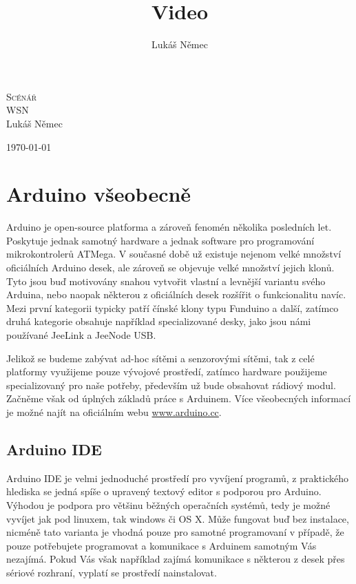 \documentclass[12pt,titlepage]{article}
\title{Video}
\author{Lukáš Němec}
\begin{document}
\begin{titlepage}
\begin{center}
\textsc{\LARGE Scénář}\\[1cm]
\textsc{\Large WSN}\\[0.6cm]


\Large{Lukáš Němec}\\[1cm]

\bigskip
\bigskip

\Large{\today}
\end{center}
\end{titlepage}



\tableofcontents
\newpage


\section{Arduino všeobecně}
Arduino je open-source platforma a zároveň fenomén několika posledních let. Poskytuje jednak samotný hardware a jednak software pro programování mikrokontrolerů ATMega. V současné době už existuje nejenom velké množství oficiálních Arduino desek, ale zároveň se objevuje velké množství jejich klonů. Tyto jsou buď motivovány snahou vytvořit vlastní a levnější variantu svého Arduina, nebo naopak některou z oficiálních desek rozšířit o funkcionalitu navíc. Mezi první kategorii typicky patří čínské klony typu Funduino a další, zatímco druhá kategorie obsahuje například specializované desky, jako jsou námi používané JeeLink a JeeNode USB.

Jelikož se budeme zabývat ad-hoc sítěmi a senzorovými sítěmi, tak z celé platformy využijeme pouze vývojové prostředí, zatímco hardware použijeme specializovaný pro naše potřeby, především už bude obsahovat rádiový modul. Začněme však od úplných základů práce s Arduinem. Více všeobecných informací je možné najít na oficiálním webu 
\url{www.arduino.cc}.

	\subsection{Arduino IDE}
	Arduino IDE je velmi jednoduché prostředí pro vyvíjení programů, z praktického hlediska se jedná spíše o upravený textový editor s podporou pro Arduino. 
	Výhodou je podpora pro většinu běžných operačních systémů, tedy je možné vyvíjet jak pod linuxem, tak windows či OS X. Může fungovat buď bez instalace, nicméně tato varianta je vhodná pouze pro samotné programovaní v případě, že pouze potřebujete programovat a komunikace s Arduinem samotným Vás nezajímá. Pokud Vás však například zajímá komunikace s některou z desek přes sériové rozhraní, vyplatí se prostředí nainstalovat.
	
\end{document}
